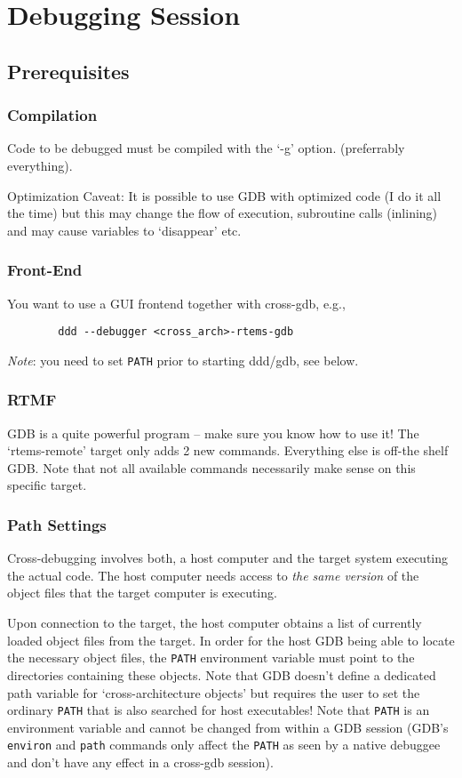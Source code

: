 \documentclass{article}
\newcommand{\cmd}[1]{{\tt #1}}
\begin{document}
\section{Debugging Session}

\subsection{Prerequisites}
\subsubsection*{Compilation}
	Code to be debugged must be compiled with the `-g' option.
    (preferrably everything).

	Optimization Caveat: It is possible to use GDB with optimized
	code (I do it all the time) but this may change the flow
	of execution, subroutine calls (inlining) and may cause
	variables to `disappear' etc.

\subsubsection*{Front-End}
	You want to use a GUI frontend together with cross-gdb, e.g.,
\begin{verbatim}
		ddd --debugger <cross_arch>-rtems-gdb
\end{verbatim}

	{\em Note\/}: you need to set {\tt PATH} prior to starting ddd/gdb,
    see below.  

\subsubsection*{RTMF}
	GDB is a quite powerful program -- make sure you know how to
	use it! The `rtems-remote' target only adds 2 new commands.
	Everything else is off-the shelf GDB.
	Note that not all available commands necessarily make sense
	on this specific target.

\subsubsection*{Path Settings}
    Cross-debugging involves both, a host computer and the
    target system executing the actual code. The host computer
    needs access to {\em the same version} of the object files
	that the target computer is executing.

	Upon connection to the target, the host computer obtains
	a list of currently loaded object files from the target.
	In order for the host GDB being able to locate the necessary
	object files, the {\tt PATH} environment variable must point to
	the directories containing these objects. Note that GDB
	doesn't define a dedicated path variable for `cross-architecture
	objects' but requires the user to set the ordinary {\tt PATH}
	that is also searched for host executables!
	Note that {\tt PATH} is an environment variable and cannot be
	changed from within a GDB session (GDB's \cmd{environ} and \cmd{path}
	commands only affect the {\tt PATH} as seen by a native debuggee
	and don't have any effect in a cross-gdb session).
\end{document}
